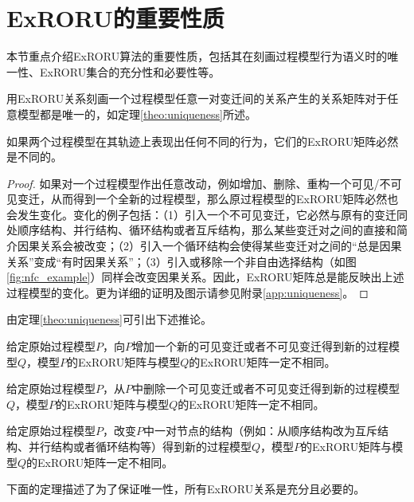 \section{ExRORU的重要性质}\label{sec:exroru_properties}
本节重点介绍ExRORU算法的重要性质，包括其在刻画过程模型行为语义时的唯一性、ExRORU集合的充分性和必要性等。

用ExRORU关系刻画一个过程模型任意一对变迁间的关系产生的关系矩阵对于任意模型都是唯一的，如定理\ref{theo:uniqueness}所述。

\begin{theorem}[唯一性]\label{theo:uniqueness}
如果两个过程模型在其轨迹上表现出任何不同的行为，它们的ExRORU矩阵必然是不同的。
\end{theorem}

\begin{proof}
如果对一个过程模型作出任意改动，例如增加、删除、重构一个可见/不可见变迁，从而得到一个全新的过程模型，那么原过程模型的ExRORU矩阵必然也会发生变化。变化的例子包括：（1）引入一个不可见变迁，它必然与原有的变迁同处顺序结构、并行结构、循环结构或者互斥结构，那么某些变迁对之间的直接和简介因果关系会被改变；（2）引入一个循环结构会使得某些变迁对之间的“总是因果关系”变成“有时因果关系”；（3）引入或移除一个非自由选择结构（如图\ref{fig:nfc_example}）同样会改变因果关系。因此，ExRORU矩阵总是能反映出上述过程模型的变化。更为详细的证明及图示请参见附录\ref{app:uniqueness}。
\end{proof}

由定理\ref{theo:uniqueness}可引出下述推论。

\begin{corollary}\label{cor:add_visible_transition}
给定原始过程模型$P$，向$P$增加一个新的可见变迁或者不可见变迁得到新的过程模型$Q$，模型$P$的ExRORU矩阵与模型$Q$的ExRORU矩阵一定不相同。
\end{corollary}

\begin{corollary}\label{cor:remove_visible_transition}
给定原始过程模型$P$，从$P$中删除一个可见变迁或者不可见变迁得到新的过程模型$Q$，模型$P$的ExRORU矩阵与模型$Q$的ExRORU矩阵一定不相同。
\end{corollary}

\begin{corollary}\label{cor:change_structure}
给定原始过程模型$P$，改变$P$中一对节点的结构（例如：从顺序结构改为互斥结构、并行结构或者循环结构等）得到新的过程模型$Q$，模型$P$的ExRORU矩阵与模型$Q$的ExRORU矩阵一定不相同。
\end{corollary}

下面的定理描述了为了保证唯一性，所有ExRORU关系是充分且必要的。

